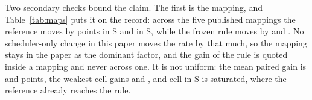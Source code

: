 Two secondary checks bound the claim. The first is the mapping, and Table~\ref{tab:maps} puts
it on the record: across the five published mappings the reference moves by
\slotPMapRefSpanSTwo{} points in S\slotCaseTwo{} and \slotPMapRefSpanSThree{} in
S\slotCaseThree, while the frozen rule moves by \slotPMapOursSpanSTwo{} and
\slotPMapOursSpanSThree{}. No scheduler-only change in this paper moves the rate by that much,
so the mapping stays in the paper as the dominant factor, and the gain of the rule is quoted
inside a mapping and never across one. It is not uniform: the mean paired gain is
\slotPMapGainMeanSTwo{} and \slotPMapGainMeanSThree{} points, the weakest cell gains
\slotPMapGainMinSTwo{} and \slotPMapGainMinSThree{}, and \slotPMapSatSTwo{} cell in
S\slotCaseTwo{} is saturated, where the reference already reaches the rule.
